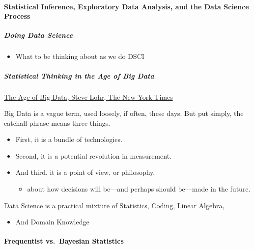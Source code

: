 \documentclass[]{article}
\providecommand{\tightlist}{%
  \setlength{\itemsep}{0pt}\setlength{\parskip}{0pt}}
\let\oldparagraph\paragraph
\renewcommand{\paragraph}[1]{\oldparagraph{#1}\mbox{}}
\let\oldsubparagraph\subparagraph
\renewcommand{\subparagraph}[1]{\oldsubparagraph{#1}\mbox{}}
\begin{document}
\paragraph{Statistical Inference, Exploratory Data Analysis, and the
Data Science
Process}\label{statistical-inference-exploratory-data-analysis-and-the-data-science-process}

\subparagraph{Doing Data Science}\label{doing-data-science}

\begin{itemize}
\tightlist
\item
  What to be thinking about as we do DSCI
\end{itemize}

\subparagraph{Statistical Thinking in the Age of Big
Data}\label{statistical-thinking-in-the-age-of-big-data}

\href{http://www.nytimes.com/2012/02/12/sunday-review/big-datas-impact-in-the-world.html?mcubz=1}{The
Age of Big Data, Steve Lohr, The New York Times}

Big Data is a vague term, used loosely, if often, these days. But put
simply, the catchall phrase means three things.

\begin{itemize}
\tightlist
\item
  First, it is a bundle of technologies.
\item
  Second, it is a potential revolution in measurement.
\item
  And third, it is a point of view, or philosophy,

  \begin{itemize}
  \tightlist
  \item
    about how decisions will be---and perhaps should be---made in the
    future.
  \end{itemize}
\end{itemize}

Data Science is a practical mixture of Statistics, Coding, Linear
Algebra,

\begin{itemize}
\tightlist
\item
  And Domain Knowledge
\end{itemize}

\paragraph{Frequentist vs.~Bayesian
Statistics}\label{frequentist-vs.bayesian-statistics}
\end{document}
